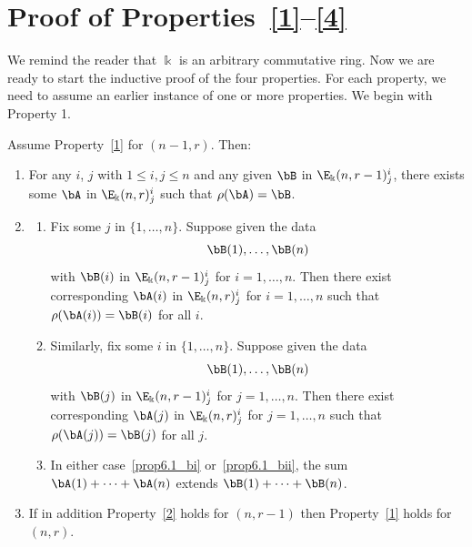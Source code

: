 \section{Proof of Properties~\texorpdfstring{\ref{1}--\ref{4}}{1--4}}\label{sec:proof}
We remind the reader that $\Bbbk$ is an arbitrary commutative
ring. Now we are ready to start the inductive proof of the four
properties. For each property, we need to assume an earlier instance
of one or more properties. We begin with Property 1.


\begin{prop}\label{prop:extend}
Assume Property~\ref{1} for $(n-1,r)$. Then:
\begin{enumerate}[label=(\alph*)]
\item\label{prop6.1_a} For any $i$, $j$ with $1 \le i,j \le n$ and any given $\bB$ in
 $\E_\Bbbk(n,r-1)^i_j$, there exists some $\bA$ in
 $\E_\Bbbk(n,r)^i_j$ such that $\rho(\bA) = \bB$.

\item\label{prop6.1_b} 
 \begin{enumerate}[label=(\roman*)]
 \item\label{prop6.1_bi} Fix some $j$ in $\{1, \dots, n\}$. Suppose given
 the data
 \[\bB(1), \dots, \bB(n)\] with $\bB(i)$ in
 $\E_\Bbbk(n,r-1)^i_j$ for $i = 1, \dots, n$. Then there exist
 corresponding $\bA(i)$ in $\E_\Bbbk(n,r)^i_j$ for $i = 1, \dots, n$
 such that $\rho(\bA(i)) = \bB(i)$ for all $i$. 

 \item\label{prop6.1_bii} Similarly, fix some $i$ in $\{1, \dots, n\}$. Suppose
 given the data
 \[\bB(1), \dots, \bB(n)\] with 
 $\bB(j)$ in
 $\E_\Bbbk(n,r-1)^i_j$ for $j = 1, \dots, n$. Then there exist
 corresponding $\bA(j)$ in $\E_\Bbbk(n,r)^i_j$ for $j = 1, \dots, n$
 such that $\rho(\bA(j)) = \bB(j)$ for all $j$. 

 \item\label{prop6.1_biii} In either case~\ref{prop6.1_bi} or~\ref{prop6.1_bii}, the sum $\bA(1)
 + \cdots + \bA(n)$ extends $\bB(1) + \cdots + \bB(n)$.
 \end{enumerate}
 
\item\label{prop6.1_c} If in addition Property~\ref{2} holds for $(n,r-1)$ then
 Property~\ref{1} holds for $(n,r)$.
\end{enumerate}
\end{prop}

